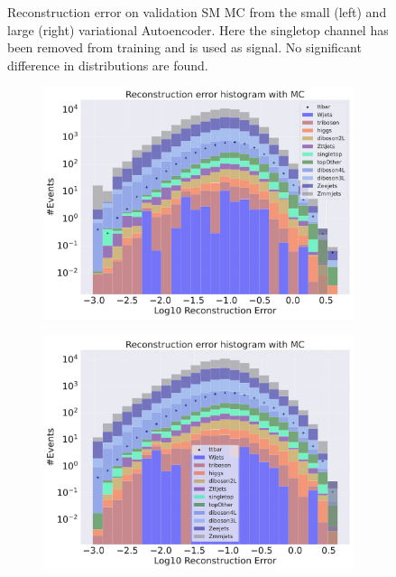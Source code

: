 \begin{figure}[H]
\begin{subfigure}{.45\textwidth}
        \caption{ }
        \label{fig:vae_big_singletop}
    \end{subfigure}
    \hfill 
    \caption[VAE | Reconstruction error using Singletop channel as signal]{Reconstruction error on validation SM MC from the small (left) and large (right) variational Autoencoder. Here the singletop channel has been removed from training and 
    is used as signal. No significant difference in distributions are found. }
    \label{fig:vae_big_channel_2}
\end{figure}

\begin{figure}[H]
    \centering
    \begin{subfigure}{.45\textwidth}
        \includegraphics[width=\textwidth]{Figures/VAE_testing/small/b_data_recon_big_rm3_feats_sig_ttbar.pdf}
        \caption{}
        \label{fig:vae_small_ttbar}
    \end{subfigure}
    \hfill 
    \begin{subfigure}{.45\textwidth}
        \includegraphics[width=\textwidth]{Figures/VAE_testing/big/b_data_recon_big_rm3_feats_sig_ttbar.pdf}

\end{subfigure}
\end{figure}
